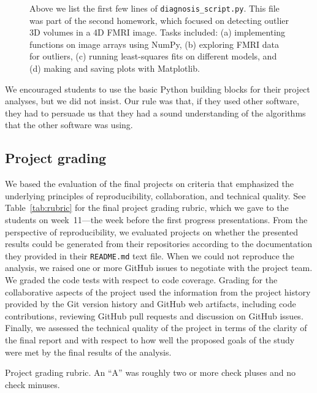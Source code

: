 \begin{figure}
\centering

\caption{Above we list the first few lines of \texttt{diagnosis\_script.py}.
This file was part of the second homework, which focused on detecting outlier
3D volumes in a 4D FMRI image.  Tasks included:
(a) implementing functions on image arrays using NumPy,
(b) exploring FMRI data for outliers,
(c) running least-squares fits on different models, and
(d) making and saving plots with Matplotlib.}\label{fig:diagnosis_script}
\end{figure}

We encouraged students to use the basic Python building blocks for their
project analyses, but we did not insist.  Our rule was that, if they used
other software, they had to persuade us that they had a sound understanding of
the algorithms that the other software was using.



\subsection{Project grading}

We based the evaluation of the final projects on criteria that emphasized the
underlying principles of reproducibility, collaboration, and technical
quality.
See Table~\ref{tab:rubric} for the final project grading rubric, which we
gave to the students on week~11---the week before the first progress
presentations.
From the perspective of reproducibility, we evaluated projects on whether the
presented results could be generated from their repositories according to the
documentation they provided in their \texttt{README.md} text file.  When we
could not reproduce the analysis, we raised one or more GitHub issues to
negotiate with the project team.
We graded the code tests with respect to code coverage.
Grading for the collaborative aspects of the project used the information
from the project history provided by the Git version history and GitHub web
artifacts, including code contributions, reviewing GitHub pull requests and
discussion on GitHub issues.
Finally, we assessed the technical quality of the project in terms of
the clarity of the final report and with respect to how well the proposed
goals of the study were met by the final results of the analysis.

\begin{table}
\centering
\begin{tiny}

\caption{Project grading rubric.
An ``A'' was roughly two or more check pluses and no check minuses.}
\label{tab:rubric}
\end{tiny}
\end{table}

